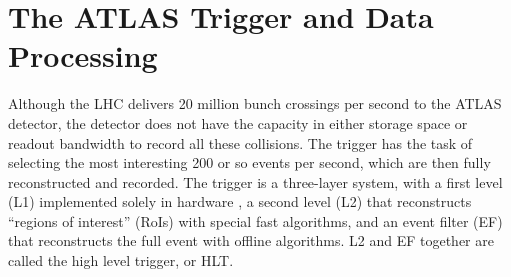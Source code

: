 \section{The ATLAS Trigger and Data Processing}
\label{sec:atlas_trig}
Although the LHC delivers 20 million bunch crossings per second to the ATLAS detector, the detector does not have 
the capacity in either storage space or readout bandwidth to record all these collisions.  The trigger has the task 
of selecting the most interesting 200 or so events per second, which are then fully reconstructed and recorded.  
The trigger is a three-layer system, with a first level (L1) implemented solely in hardware
, a second level (L2) that reconstructs ``regions of interest'' (RoIs) with special fast 
algorithms, and an event filter (EF) that reconstructs the full event with offline algorithms.  L2 and 
EF together are called the high level trigger, or HLT.



%
 

